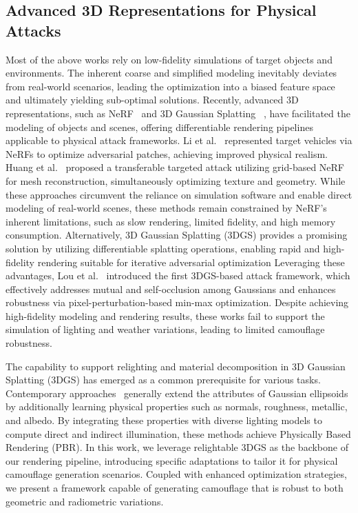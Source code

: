\documentclass[10pt,journal,compsoc]{IEEEtran}
\begin{document}
\subsection{Advanced 3D Representations for Physical Attacks}
Most of the above works rely on low-fidelity simulations of target objects and environments. 
The inherent coarse and simplified modeling inevitably deviates from real-world scenarios, leading the optimization into a biased feature space and ultimately yielding sub-optimal solutions.
Recently, advanced 3D representations, such as NeRF~\cite{mildenhall2021nerf} and 3D Gaussian Splatting ~\cite{kerbl20233dgs}, have facilitated the modeling of objects and scenes, offering differentiable rendering pipelines applicable to physical attack frameworks.
Li et al.~\cite{li2023adv3d} represented target vehicles via NeRFs to optimize adversarial patches, achieving improved physical realism. Huang et al.~\cite{huang2024tt3d} proposed a transferable targeted attack utilizing grid-based NeRF for mesh reconstruction, simultaneously optimizing texture and geometry. 
While these approaches circumvent the reliance on simulation software and enable direct modeling of real-world scenes, these methods remain constrained by NeRF's inherent limitations, such as slow rendering, limited fidelity, and high memory consumption.
Alternatively, 3D Gaussian Splatting (3DGS) provides a promising solution by utilizing differentiable splatting operations, enabling rapid and high-fidelity rendering suitable for iterative adversarial optimization
Leveraging these advantages, Lou et al.~\cite{lou2025pga} introduced the first 3DGS-based attack framework, which effectively addresses mutual and self-occlusion among Gaussians and enhances robustness via pixel-perturbation-based min-max optimization.
Despite achieving high-fidelity modeling and rendering results, these works fail to support the simulation of lighting and weather variations, leading to limited camouflage robustness.

The capability to support relighting and material decomposition in 3D Gaussian Splatting (3DGS) has emerged as a common prerequisite for various tasks. 
Contemporary approaches~\cite{shi2025gir, moenne2024raytracing, liang2024gsir, gao2024relightable, ye2025geosplatting, jiang2024gaussianshader, kaleta2025lumigauss} generally extend the attributes of Gaussian ellipsoids by additionally learning physical properties such as normals, roughness, metallic, and albedo. 
By integrating these properties with diverse lighting models to compute direct and indirect illumination, these methods achieve Physically Based Rendering (PBR). 
In this work, we leverage relightable 3DGS as the backbone of our rendering pipeline, introducing specific adaptations to tailor it for physical camouflage generation scenarios. Coupled with enhanced optimization strategies, we present a framework capable of generating camouflage that is robust to both geometric and radiometric variations.
\end{document}
